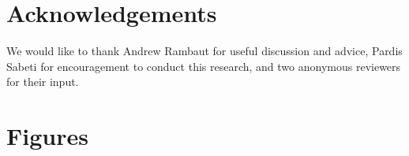 \documentclass{bmcart}
\begin{document}
\begin{backmatter}
\section*{Acknowledgements}
We would like to thank Andrew Rambaut for useful discussion and advice, Pardis Sabeti for encouragement to conduct this research, and two anonymous reviewers for their input. \\





\section*{Figures}


\end{backmatter}
\end{document}

